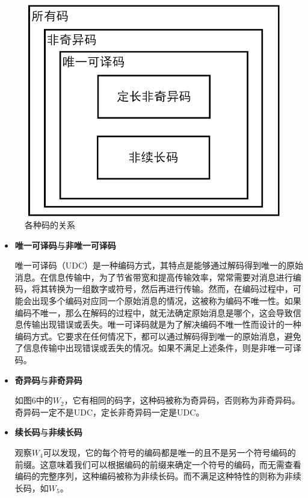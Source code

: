 \documentclass[UTF8,a4paper,11pt]{article}
\begin{document}
\begin{figure}[htbp]
\centering
\includegraphics[scale=0.45]{p7.png}
\caption{各种码的关系}
\end{figure}

\begin{itemize}
\item \textbf{唯一可译码}与\textbf{非唯一可译码}

唯一可译码（UDC）是一种编码方式，其特点是能够通过解码得到唯一的原始消息。在信息传输中，为了节省带宽和提高传输效率，常常需要对消息进行编码，将其转换为一组数字或符号，然后再进行传输。然而，在编码过程中，可能会出现多个编码对应同一个原始消息的情况，这被称为编码不唯一性。如果编码不唯一，那么在解码的过程中，就无法确定原始消息是哪个，这会导致信息传输出现错误或丢失。唯一可译码就是为了解决编码不唯一性而设计的一种编码方式。它要求在任何情况下，都可以通过解码得到唯一的原始消息，避免了信息传输中出现错误或丢失的情况。如果不满足上述条件，则是非唯一可译码。

\item \textbf{奇异码}与\textbf{非奇异码}

如图6中的$W_2$，它有相同的码字，这种码被称为奇异码，否则称为非奇异码。奇异码一定不是UDC，定长非奇异码一定是UDC。

\item \textbf{续长码}与\textbf{非续长码}

观察$W_4$可以发现，它的每个符号的编码都是唯一的且不是另一个符号编码的前缀。这意味着我们可以根据编码的前缀来确定一个符号的编码，而无需查看编码的完整序列，这种编码被称为非续长码。而不满足这种特性的则称为非续长码，如$W_5$。

\end{itemize}
\end{document}

